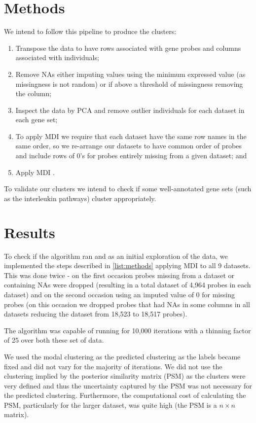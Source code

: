 \documentclass[12pt]{article} %
\begin{document}
	\section{Methods}
	We intend to follow this pipeline to produce the clusters:
	\begin{enumerate} \label{list:methods}
		\item Transpose the data to have rows associated with gene probes and columns associated with individuals;
		\item Remove NAs either imputing values using the minimum expressed value (as missingness is not random) or if above a threshold of missingness removing the column;
		\item Inspect the data by PCA and remove outlier individuals for each dataset in each gene set;
		\item To apply MDI we require that each dataset have the same row names in the same order, so we re-arrange our datasets to have common order of probes and include rows of 0’s for probes entirely missing from a given dataset; and
		\item Apply MDI \cite{mason_mdi-gpu:_2016}.
	\end{enumerate}
	To validate our clusters we intend to check if some well-annotated gene sets (such as the interleukin pathways) cluster appropriately.


	\section{Results}
	
	To check if the algorithm ran and as an initial exploration of the data, we implemented the steps described in \ref{list:methods} applying MDI to all 9 datasets. This was done twice - on the first occasion probes missing from a dataset or containing NAs were dropped (resulting in a total dataset of 4,964 probes in each dataset) and on the second occasion using an imputed value of 0 for missing probes (on this occasion we dropped probes that had NAs in some columns in all datasets reducing the dataset from 18,523 to 18,517 probes).
	
	The algorithm was capable of running for 10,000 iterations with a thinning factor of 25 over both these set of data.
	
	We used the modal clustering as the predicted clustering as the labels became fixed and did not vary for the majority of iterations. We did not use the clustering implied by the posterior similarity matrix (PSM) as the clusters were very defined and thus the uncertainty captured by the PSM was not necessary for the predicted clustering. Furthermore, the computational cost of calculating the PSM, particularly for the larger dataset, was quite high (the PSM is a $n \times n$ matrix).
	
\end{document}
